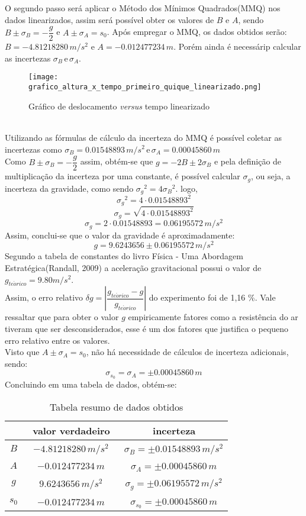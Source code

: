 \documentclass[a4paper, 12pt]{article}
\begin{document}
		\noindent O segundo passo será aplicar o Método dos Mínimos Quadrados(MMQ) nos dados linearizados, assim será possível obter os valores de $B$ e $A$, sendo $B \pm \sigma_B = -\dfrac{g}{2}$ e $A \pm \sigma_{A} =s_0$. Após empregar o MMQ, os dados obtidos serão: $B=-4.81218280 \, m/s^2$ e $A = -0.012477234 \, m$. Porém ainda é necessárip calcular as incertezas $\sigma_B \, \mathrm{e} \, \sigma_{A}$.
		\begin{figure}[htb]
			\centering
			\texttt{[image: grafico\_altura\_x\_tempo\_primeiro\_quique\_linearizado.png]}
			\caption{Gráfico de deslocamento \textsl{versus} tempo linearizado}
			\label{g1}
		\end{figure} \\	
		Utilizando as fórmulas de cálculo da incerteza do MMQ é possível coletar as incertezas como $\sigma_B = 0.01548893 \, m/s^2 \, \mathrm{e} \, \sigma_{A}= 0.00045860 \, m$ \\
		Como $B \pm \sigma_B = -\dfrac{g}{2}$ assim, obtém-se que $g=-2B\pm2\sigma_B$ e pela definição de multiplicação da incerteza por uma constante, é possível calcular $\sigma_g$, ou seja, a incerteza da gravidade, como sendo ${\sigma_g}^2=4{\sigma_B}^2$. logo, \\
		$${\sigma_g}^2=4 \cdot {0.01548893}^2$$
		$$\sigma_g =\sqrt{4 \cdot {0.01548893}^2}$$
		$$\sigma_g=2 \cdot 0.01548893 = 0.06195572 \, m/s^2$$
		Assim, conclui-se que o valor da gravidade é aproximadamente:
		$$g = 9.6243656 \pm 0.06195572 \, m/s^2$$
		Segundo a tabela de constantes do livro Física - Uma Abordagem Estratégica(Randall, 2009) a aceleração gravitacional possui o valor de $g_{te \acute{o} rico} = 9.80 m/s^2$. \\
		Assim, o erro relativo $\delta g = \left| \dfrac{g_{te \acute{o} rico}-g}{g_{te \acute{o} rico}} \right|$ do experimento foi de 1,16 \%. Vale ressaltar que para obter o valor $g$ empiricamente fatores como a resistência do ar tiveram que ser desconsiderados, esse é um dos fatores que justifica o pequeno erro relativo entre os valores.\\
		Visto que $A \pm \sigma_{A} =s_0$, não há necessidade de cálculos de incerteza adicionais, sendo:  $$\sigma_{s_0} = \sigma_{A} = \pm0.00045860 \, m$$		
		\noindent Concluindo em uma tabela de dados, obtém-se:
		\begin{table}[H]
			\centering
			\begin{tabular}{c|c|c}
				\hline \,  & \ valor verdadeiro & \ incerteza \\
				\hline $B$ & \ $-4.81218280 \, m/s^2$ & \ $\sigma_B = \pm 0.01548893 \, m/s^2$ \\
				\hline $A$ & \ $-0.012477234 \, m$ & \ $\sigma_{A}= \pm 0.00045860 \, m$ \\
				\hline $g$ & \ $9.6243656 \, m/s^2$ & \ $\sigma_g = \pm 0.06195572 \, m/s^2$ \\
				\hline $s_0$ & \ $-0.012477234 \, m$ & \ $\sigma_{s_0} = \pm 0.00045860 \, m$ \\
				
				\hline
			\end{tabular}	
			\caption{Tabela resumo de dados obtidos}
			\label{tcm}		
		\end{table}
\end{document}
